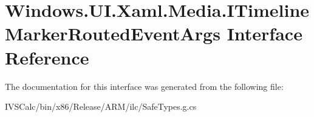 \hypertarget{interface_windows_1_1_u_i_1_1_xaml_1_1_media_1_1_i_timeline_marker_routed_event_args}{}\section{Windows.\+U\+I.\+Xaml.\+Media.\+I\+Timeline\+Marker\+Routed\+Event\+Args Interface Reference}
\label{interface_windows_1_1_u_i_1_1_xaml_1_1_media_1_1_i_timeline_marker_routed_event_args}


The documentation for this interface was generated from the following file\+:\begin{DoxyCompactItemize}
\item 
I\+V\+S\+Calc/bin/x86/\+Release/\+A\+R\+M/ilc/Safe\+Types.\+g.\+cs\end{DoxyCompactItemize}
